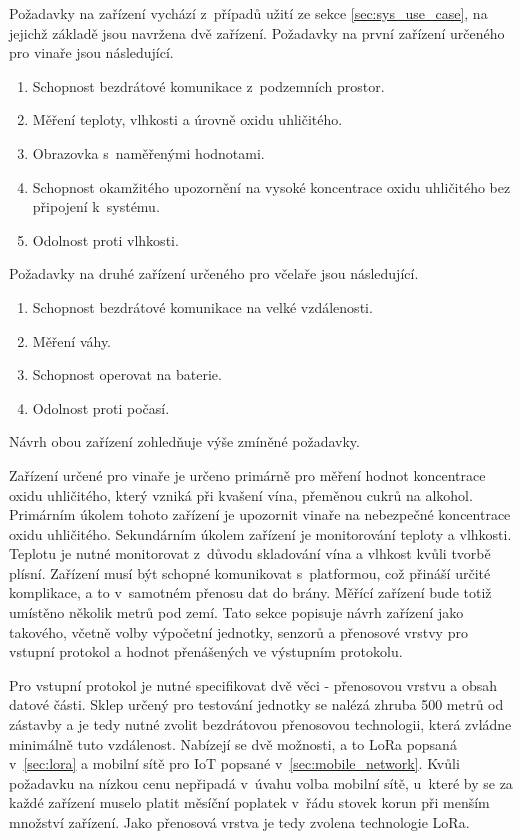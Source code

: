  \label{sec:spec_dev}
Požadavky na zařízení vychází z~případů užití ze sekce \ref{sec:sys_use_case}, na jejichž základě jsou navržena dvě zařízení. Požadavky na první zařízení určeného pro vinaře jsou následující.
\begin{enumerate}
    \item Schopnost bezdrátové komunikace z~podzemních prostor. \label{cellar:spec1}
    \item Měření teploty, vlhkosti a úrovně oxidu uhličitého.\label{cellar:spec2}
    \item Obrazovka s~naměřenými hodnotami.\label{cellar:spec3}
    \item Schopnost okamžitého upozornění na vysoké koncentrace oxidu uhličitého bez připojení k~systému.\label{cellar:spec4}
    \item Odolnost proti vlhkosti.\label{cellar:spec5}
\end{enumerate}
Požadavky na druhé zařízení určeného pro včelaře jsou následující.
\begin{enumerate}
    \item Schopnost bezdrátové komunikace na velké vzdálenosti. \label{scale:spec1}
    \item Měření váhy. \label{scale:spec2}
    \item Schopnost operovat na baterie. \label{scale:spec3}
    \item Odolnost proti počasí. \label{scale:spec4}
\end{enumerate}
Návrh obou zařízení zohledňuje výše zmíněné požadavky.

 \label{sec:cellar_design}
Zařízení určené pro vinaře je určeno primárně pro měření hodnot koncentrace oxidu uhličitého, který vzniká při kvašení vína, přeměnou cukrů na alkohol. Primárním úkolem tohoto zařízení je upozornit vinaře na nebezpečné koncentrace oxidu uhličitého. Sekundárním úkolem zařízení je monitorování teploty a vlhkosti. Teplotu je nutné monitorovat z~důvodu skladování vína a vlhkost kvůli tvorbě plísní. Zařízení musí být schopné komunikovat s~platformou, což přináší určité komplikace, a to v~samotném přenosu dat do brány. Měřící zařízení bude totiž umístěno několik metrů pod zemí. Tato sekce popisuje návrh zařízení jako takového, včetně volby výpočetní jednotky, senzorů a přenosové vrstvy pro vstupní protokol a hodnot přenášených ve výstupním protokolu.

 \label{sec:cellar_data_packet}
Pro vstupní protokol je nutné specifikovat dvě věci - přenosovou vrstvu a obsah datové části. Sklep určený pro testování jednotky se nalézá zhruba 500 metrů od zástavby a je tedy nutné zvolit bezdrátovou přenosovou technologii, která zvládne minimálně tuto vzdálenost. Nabízejí se dvě možnosti, a to LoRa popsaná v~\ref{sec:lora} a mobilní sítě pro IoT popsané v~\ref{sec:mobile_network}. Kvůli požadavku na nízkou cenu nepřipadá v~úvahu volba mobilní sítě, u~které by se za každé zařízení muselo platit měsíční poplatek v~řádu stovek korun při menším množství zařízení. Jako přenosová vrstva je tedy zvolena technologie LoRa.

